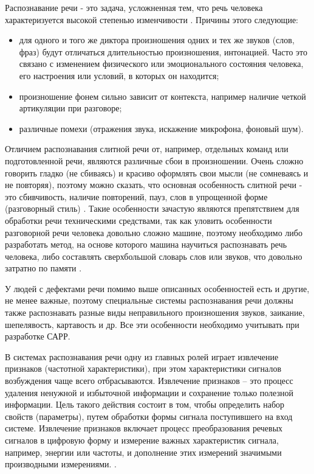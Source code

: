 Распознавание речи - это задача, усложненная тем, что речь человека характеризуется высокой степенью изменчивости \cite{spr}. Причины этого следующие:
\begin{itemize}
	\item для одного и того же диктора произношения одних и тех же звуков (слов, фраз) будут отличаться длительностью произношения, интонацией. Часто это связано с изменением физического или эмоционального состояния человека, его настроения или условий, в которых он находится;
	\item произношение фонем сильно зависит от контекста, например наличие четкой артикуляции при разговоре;
	\item различные помехи (отражения звука, искажение микрофона, фоновый шум).
\end{itemize}

Отличием распознавания слитной речи от, например, отдельных команд или подготовленной речи, являются различные сбои в произношении. \cite{rechsb2} \cite{rechsb1} Очень сложно говорить гладко (не сбиваясь) и красиво оформлять свои мысли (не сомневаясь и не повторяя), поэтому можно сказать, что основная особенность слитной речи - это сбивчивость, наличие повторений, пауз, слов в упрощенной форме (разговорный стиль) \cite{slitrech}. Такие особенности зачастую являются препятствием для обработки речи техническими средствами, так как уловить особенности разговорной речи человека довольно сложно машине, поэтому необходимо либо разработать метод, на основе которого машина научиться распознавать речь человека, либо составлять сверхбольшой словарь слов или звуков, что довольно затратно по памяти \cite{slitrech}.

У людей с дефектами речи помимо выше описанных особенностей есть и другие, не менее важные, поэтому специальные системы распознавания речи должны также распознавать разные виды неправильного произношения звуков, заикание, шепелявость, картавость и др. Все эти особенности необходимо учитывать при разработке САРР. 


В системах распознавания речи одну из главных ролей играет извлечение признаков (частотной характеристики), при этом характеристики сигналов возбуждения чаще всего отбрасываются. Извлечение признаков -- это процесс удаления ненужной и избыточной информации и сохранение только полезной информации. Цель такого действия состоит в том, чтобы определить набор свойств (параметры), путем обработки формы сигнала поступившего на вход системе.  Извлечение признаков включает процесс преобразования речевых сигналов в цифровую форму и измерение важных характеристик сигнала, например, энергии или частоты, и дополнение этих измерений значимыми производными измерениями. \cite{isvparam1} \cite{isvparam2}.

